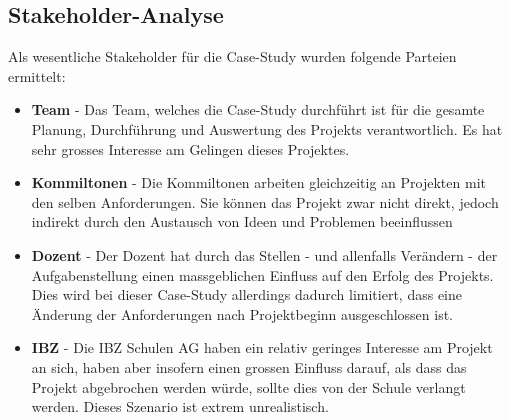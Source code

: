 \subsection{Stakeholder-Analyse}
Als wesentliche Stakeholder für die Case-Study wurden folgende Parteien ermittelt:

\begin{itemize}
  \item \textbf{Team} - Das Team, welches die Case-Study durchführt ist für die gesamte Planung, Durchführung und Auswertung des Projekts verantwortlich. Es hat sehr grosses Interesse am Gelingen dieses Projektes.
  \item \textbf{Kommiltonen} - Die Kommiltonen arbeiten gleichzeitig an Projekten mit den selben Anforderungen. Sie können das Projekt zwar nicht direkt, jedoch indirekt durch den Austausch von Ideen und Problemen beeinflussen
  \item \textbf{Dozent} - Der Dozent hat durch das Stellen - und allenfalls Verändern - der Aufgabenstellung einen massgeblichen Einfluss auf den Erfolg des Projekts. Dies wird bei dieser Case-Study allerdings dadurch limitiert, dass eine Änderung der Anforderungen nach Projektbeginn ausgeschlossen ist.
  \item \textbf{IBZ} - Die IBZ Schulen AG haben ein relativ geringes Interesse am Projekt an sich, haben aber insofern einen grossen Einfluss darauf, als dass das Projekt abgebrochen werden würde, sollte dies von der Schule verlangt werden. Dieses Szenario ist extrem unrealistisch.
\end{itemize}

\vspace{5mm}

